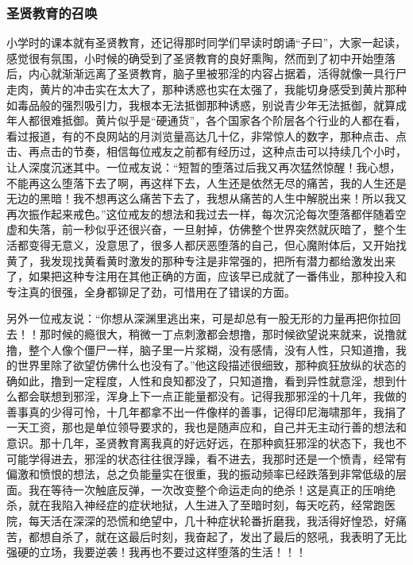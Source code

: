 \subsubsection{圣贤教育的召唤}

小学时的课本就有圣贤教育，还记得那时同学们早读时朗诵“子曰”，大家一起读，感觉很有氛围，小时候的确受到了圣贤教育的良好熏陶，然而到了初中开始堕落后，内心就渐渐远离了圣贤教育，脑子里被邪淫的内容占据着，活得就像一具行尸走肉，黄片的冲击实在太大了，那种诱惑也实在太强了，我能切身感受到黄片那种如毒品般的强烈吸引力，我根本无法抵御那种诱惑，别说青少年无法抵御，就算成年人都很难抵御。黄片似乎是“硬通货”，各个国家各个阶层各个行业的人都在看，看过报道，有的不良网站的月浏览量高达几十亿，非常惊人的数字，那种点击、点击、再点击的节奏，相信每位戒友之前都有经历过，这种点击可以持续几个小时，让人深度沉迷其中。一位戒友说：“短暂的堕落过后我又再次猛然惊醒！我心想，不能再这么堕落下去了啊，再这样下去，人生还是依然无尽的痛苦，我的人生还是无边的黑暗！我不想再这么痛苦下去了，我想从痛苦的人生中解脱出来！所以我又再次振作起来戒色。”这位戒友的想法和我过去一样，每次沉沦每次堕落都伴随着空虚和失落，前一秒似乎还很兴奋，一旦射掉，仿佛整个世界突然就灰暗了，整个生活都变得无意义，没意思了，很多人都厌恶堕落的自己，但心魔附体后，又开始找黄了，我发现找黄看黄时激发的那种专注是非常强的，把所有潜力都给激发出来了，如果把这种专注用在其他正确的方面，应该早已成就了一番伟业，那种投入和专注真的很强，全身都铆足了劲，可惜用在了错误的方面。

另外一位戒友说：“你想从深渊里逃出来，可是却总有一股无形的力量再把你拉回去！！那时候的瘾很大，稍微一丁点刺激都会想撸，那时候欲望说来就来，说撸就撸，整个人像个僵尸一样，脑子里一片浆糊，没有感情，没有人性，只知道撸，我的世界里除了欲望仿佛什么也没有了。”他这段描述很细致，那种疯狂放纵的状态的确如此，撸到一定程度，人性和良知都没了，只知道撸，看到异性就意淫，想到什么都会联想到邪淫，浑身上下一点正能量都没有。记得我那邪淫的十几年，我做的善事真的少得可怜，十几年都拿不出一件像样的善事，记得印尼海啸那年，我捐了一天工资，那也是单位领导要求的，我也是随声应和，自己并无主动行善的想法和意识。那十几年，圣贤教育离我真的好远好远，在那种疯狂邪淫的状态下，我也不可能学得进去，邪淫的状态往往很浮躁，看不进去，我那时还是一个愤青，经常有偏激和愤恨的想法，总之负能量实在很重，我的振动频率已经跌落到非常低级的层面。我在等待一次触底反弹，一次改变整个命运走向的绝杀！这是真正的压哨绝杀，就在我陷入神经症的症状地狱，人生进入了至暗时刻，每天吃药，经常跑医院，每天活在深深的恐慌和绝望中，几十种症状轮番折磨我，我活得好惶恐，好痛苦，都想自杀了，就在这最后时刻，我奋起了，发出了最后的怒吼，我表明了无比强硬的立场，我要逆袭！我再也不要过这样堕落的生活！！！

